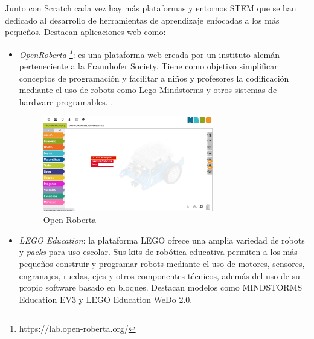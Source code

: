 Junto con Scratch cada vez hay más plataformas y entornos STEM que se han dedicado al desarrollo de herramientas de aprendizaje enfocadas a los más pequeños. Destacan aplicaciones web como: 

\begin{itemize}
    \item  \textit{OpenRoberta \footnote{https://lab.open-roberta.org/}}: es una plataforma web creada por un instituto alemán perteneciente a la Fraunhofer Society. Tiene como objetivo simplificar conceptos de programación y facilitar a niños y profesores la codificación mediante el uso de robots como Lego Mindstorms y otros sistemas de hardware programables. \cite{openroberta}. 
    
    \begin{figure}[H]
        \centering
        \includegraphics[width=0.7\textwidth ]{chapters/images/openrobert.png}
        \caption{Open Roberta}
        \label{fig:openroberta}
    \end{figure}
    \item \textit{LEGO Education}: la plataforma LEGO ofrece una amplia variedad de robots y \textit{packs} para uso escolar. Sus kits de robótica educativa permiten a los más pequeños construir y programar robots mediante el uso de motores, sensores, engranajes, ruedas, ejes y otros componentes técnicos, además del uso de su propio software basado en bloques. Destacan modelos como  MINDSTORMS Education EV3 y LEGO Education WeDo 2.0.\cite{ev3} \cite{legoeducation}


\end{itemize}
